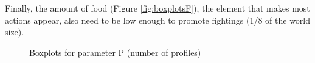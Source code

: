 \documentclass[runningheads,a4paper]{llncs}
\begin{document}
Finally, the amount of food (Figure \ref{fig:boxplotsF}), the
element that makes most actions appear, also need to be low enough to
promote fightings (1/8 of the world size). 







\begin{figure}
        \centering
        \caption{Boxplots for parameter P (number of profiles)}\label{fig:boxplotsP}
\end{figure}
\end{document}
